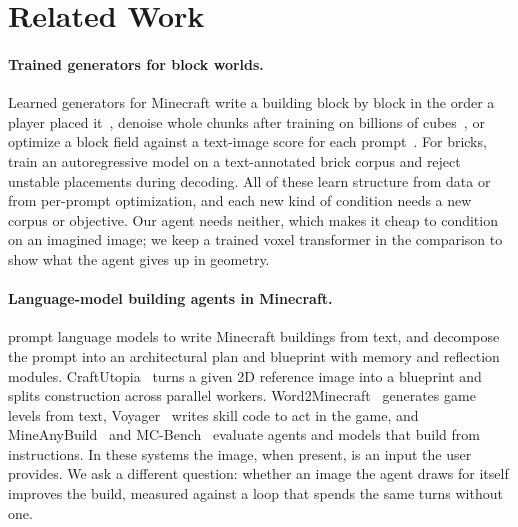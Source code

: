 \section{Related Work}
\label{sec:related}

\paragraph{Trained generators for block worlds.}
Learned generators for Minecraft write a building block by block in the order a player placed
it~\citep{chen2019voxelcnn}, denoise whole chunks after training on billions of
cubes~\citep{merino2026dreamcubed}, or optimize a block field against a text-image score for each
prompt~\citep{earle2024dreamcraft}. For bricks, \citet{pun2025brickgpt} train an autoregressive
model on a text-annotated brick corpus and reject unstable placements during decoding. All of these
learn structure from data or from per-prompt optimization, and each new kind of condition needs a
new corpus or objective. Our agent needs neither, which makes it cheap to condition on an imagined
image; we keep a trained voxel transformer in the comparison to show what the agent gives up in
geometry.

\paragraph{Language-model building agents in Minecraft.}
\citet{hu2024t2bm} prompt language models to write Minecraft buildings from text, and
\citet{chen2024apt} decompose the prompt into an architectural plan and blueprint with memory and
reflection modules. CraftUtopia~\citep{fu2026craftutopia} turns a given 2D reference image into a
blueprint and splits construction across parallel workers. Word2Minecraft~\citep{huang2025word2minecraft}
generates game levels from text, Voyager~\citep{wang2023voyager} writes skill code to act in the game, and
MineAnyBuild~\citep{wei2025mineanybuild} and MC-Bench~\citep{mcbench2025} evaluate agents and
models that build from instructions. In these systems the image, when present, is an input the user
provides. We ask a different question: whether an image the agent draws for itself improves the
build, measured against a loop that spends the same turns without one.

